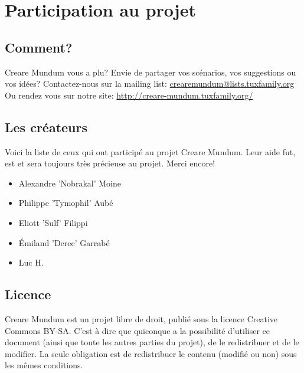 \documentclass[a4paper, 11pt]{article}
\begin{document}

\newpage
\section{Participation au projet}
\subsection{Comment?}
\hypertarget{participation}{}
Creare Mundum vous a plu? 
Envie de partager vos scénarios, vos suggestions ou vos idées?
\newline
Contactez-nous sur la mailing list: \href {mailto:crearemundum@lists.tuxfamily.org}{crearemundum@lists.tuxfamily.org}
\newline
Ou rendez vous sur notre site: \href {http://creare-mundum.tuxfamily.org/} {http://creare-mundum.tuxfamily.org/}
\subsection{Les créateurs}
Voici la liste de ceux qui ont participé au projet Creare Mundum. Leur aide fut, est et sera toujours très précieuse au projet. Merci encore!  
\begin{itemize}
\item Alexandre ’Nobrakal’ Moine 
\item Philippe ’Tymophil’ Aubé 
\item Eliott ’Sulf’ Filippi
\item Émiland ’Derec’ Garrabé
\item Luc H.
\end{itemize}
\subsection{Licence}
Creare Mundum est un projet libre de droit, publié sous la licence Creative Commons BY-SA. C'est à dire que quiconque a la possibilité d'utiliser ce document (ainsi que toute les autres parties du projet), de le redistribuer et de le modifier. La seule obligation est de redistribuer le contenu (modifié ou non) sous les mêmes conditions.
\end{document}
